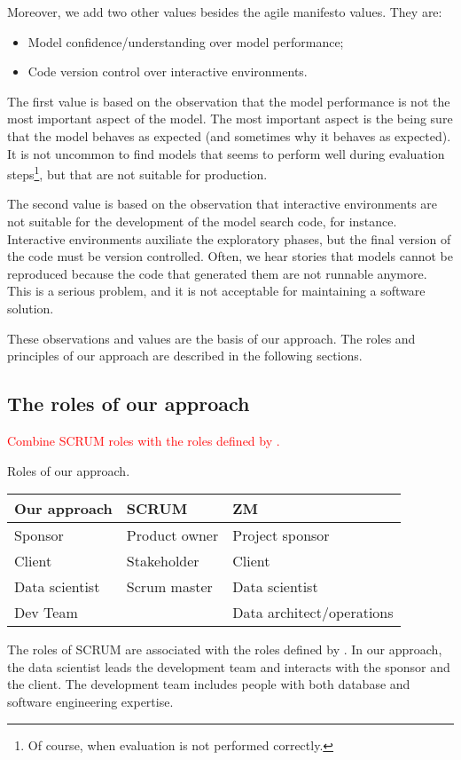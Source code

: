 Moreover, we add two other values besides the agile manifesto values.  They are:
\begin{itemize}
  \item Model confidence/understanding over model performance;
  \item Code version control over interactive environments.
\end{itemize}

The first value is based on the observation that the model performance is not the most
important aspect of the model.  The most important aspect is the being sure that the model
behaves as expected (and sometimes why it behaves as expected).  It is not uncommon to find
models that seems to perform well during evaluation steps\footnote{Of course, when
evaluation is not performed correctly.}, but that are not suitable for production.

The second value is based on the observation that interactive environments are not suitable
for the development of the model search code, for instance.  Interactive environments
auxiliate the exploratory phases, but the final version of the code must be version
controlled.  Often, we hear stories that models cannot be reproduced because the code that
generated them are not runnable anymore.  This is a serious problem, and it is not
acceptable for maintaining a software solution.

These observations and values are the basis of our approach.  The roles and principles of
our approach are described in the following sections.

\subsection{The roles of our approach}

\textcolor{red}{Combine SCRUM roles with the roles defined by \textcite{Zumel2019}.}

\begin{tablebox}[label=tab:roles]{Roles of our approach.}
  \centering
  \begin{tabular}{lll}
    \toprule
    \textbf{Our approach} & \textbf{SCRUM} & \textbf{ZM} \\
    \midrule
    Sponsor & Product owner & Project sponsor \\
    Client & Stakeholder & Client \\
    Data scientist & Scrum master & Data scientist \\
    Dev Team & & Data architect/operations \\
    \bottomrule
  \end{tabular}
  \tcblower
  The roles of SCRUM are associated with the roles defined by \textcite{Zumel2019}.
  In our approach, the data scientist leads the development team and interacts with the sponsor
  and the client.  The development team includes people with both database and software
  engineering expertise.
\end{tablebox}

